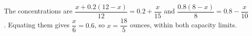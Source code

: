 The concentrations are $\dfrac{x+0.2(12-x)}{12}=0.2+\dfrac{x}{15}$ and $\dfrac{0.8(8-x)}{8}=0.8-\dfrac{x}{10}$. Equating them gives $\dfrac{x}{6}=0.6$, so $\boxed{x=\dfrac{18}{5}}$ ounces, within both capacity limits.
